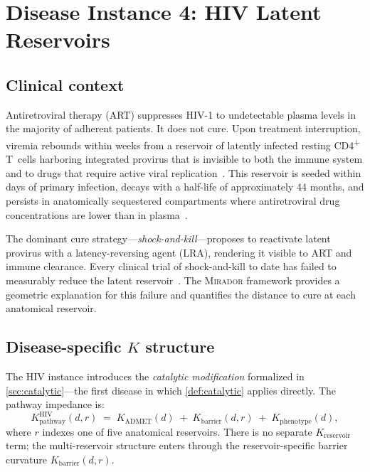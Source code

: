 \documentclass[11pt]{article}
\theoremstyle{plain}
\theoremstyle{definition}
\newcommand{\mirador}{\textsc{Mirador}}
\newcommand{\Kpath}{K_{\mathrm{pathway}}}
\newcommand{\Kbarr}{K_{\mathrm{barrier}}}
\newcommand{\Kpheno}{K_{\mathrm{phenotype}}}
\newcommand{\Kres}{K_{\mathrm{reservoir}}}
\newcommand{\Kadmet}{K_{\mathrm{ADMET}}}
\begin{document}
\section{Disease Instance 4: HIV Latent Reservoirs}
\label{sec:hiv}

\subsection{Clinical context}
\label{sec:hiv-context}

Antiretroviral therapy (ART) suppresses HIV-1 to undetectable
plasma levels in the majority of adherent patients. It does not
cure. Upon treatment interruption, viremia rebounds within weeks
from a reservoir of latently infected resting CD4\textsuperscript{+}
T~cells harboring integrated provirus that is invisible to both
the immune system and to drugs that require active viral
replication~\cite{Finzi1999, Siliciano2003}. This reservoir
is seeded within days of primary infection, decays with a half-life
of approximately 44 months, and persists in anatomically
sequestered compartments where antiretroviral drug concentrations
are lower than in plasma~\cite{Fletcher2014}.

The dominant cure strategy---\emph{shock-and-kill}---proposes to
reactivate latent provirus with a latency-reversing agent (LRA),
rendering it visible to ART and immune clearance. Every clinical
trial of shock-and-kill to date has failed to measurably reduce the
latent reservoir~\cite{Archin2012, Rasmussen2014}. The
\mirador{} framework provides a geometric explanation for this
failure and quantifies the distance to cure at each anatomical
reservoir.

\subsection{Disease-specific \texorpdfstring{$K$}{K} structure}
\label{sec:hiv-k}

The HIV instance introduces the \emph{catalytic modification}
formalized in \cref{sec:catalytic}---the first disease in which
\cref{def:catalytic} applies directly. The pathway impedance is:
\begin{equation}
  \label{eq:k-hiv}
  \Kpath^{\mathrm{HIV}}(d, r) \;=\;
  \Kadmet(d) \;+\; \Kbarr(d, r) \;+\; \Kpheno(d),
\end{equation}
where $r$ indexes one of five anatomical reservoirs. There is no
separate $\Kres$ term; the multi-reservoir structure enters through
the reservoir-specific barrier curvature $\Kbarr(d, r)$.
\end{document}
